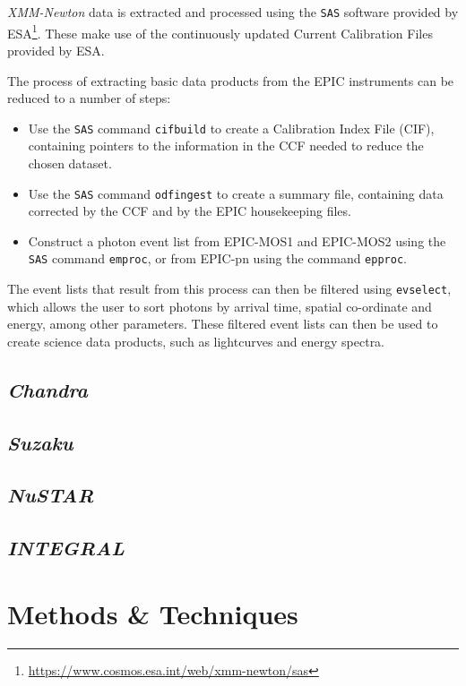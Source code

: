 \par \textit{XMM-Newton} data is extracted and processed using the \texttt{SAS} software \citep{Ibarra_sas} provided by ESA\footnote{\url{https://www.cosmos.esa.int/web/xmm-newton/sas}}.  These make use of the continuously updated Current Calibration Files provided by ESA.
\par The process of extracting basic data products from the EPIC instruments can be reduced to a number of steps:
\begin{itemize}
\item Use the \texttt{SAS} command \texttt{cifbuild} to create a Calibration Index File (CIF), containing pointers to the information in the CCF needed to reduce the chosen dataset.
\item Use the \texttt{SAS} command \texttt{odfingest} to create a summary file, containing data corrected by the CCF and by the EPIC housekeeping files.
\item Construct a photon event list from EPIC-MOS1 and EPIC-MOS2 using the \texttt{SAS} command \texttt{emproc}, or from EPIC-pn using the command \texttt{epproc}.
\end{itemize}
The event lists that result from this process can then be filtered using \texttt{evselect}, which allows the user to sort photons by arrival time, spatial co-ordinate and energy, among other parameters.  These filtered event lists can then be used to create science data products, such as lightcurves and energy spectra.

\subsection{\textit{Chandra}}

\subsection{\textit{Suzaku}}

\subsection{\textit{NuSTAR}}

\subsection{\textit{INTEGRAL}}

\section{Methods \& Techniques}

